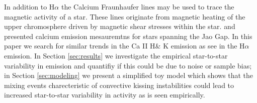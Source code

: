 In addition to H$\alpha$ the Calcium Fraunhaufer lines may be used to trace the
magnetic activity of a star. These lines originate from magnetic heating of the
upper chromosphere driven by magnetic shear stresses within the star.
\citet{Boudreaux2022} and \citet{Perdelwitz2021} presented calcium emission
mesauremtns for stars spanning the Jao Gap. In this paper we search for similar
trends in the Ca II H\& K emission as \citeauthor{Jao2023} see in the H$\alpha$
emission. In Section \ref{sec:results} we investigate the empirical
star-to-star variability in emission and quantifiy if this could be due to
noise or sample bias; in Section \ref{sec:modeling} we present a simplified toy
model which shows that the mixing events charecteristic of convective kissing
instabilities could lead to increased star-to-star variability in activity as
is seen empirically.

%

